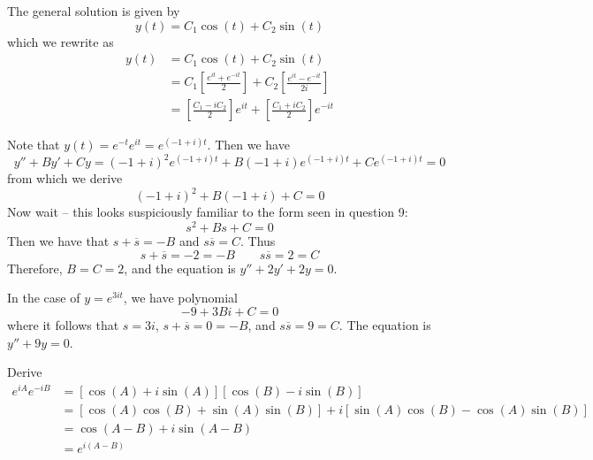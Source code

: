 \documentclass[a4paper]{article}
\begin{document}
The general solution is given by
\[
	y \!\left( t \right) = C_{1} \cos\left( t \right) + C_{2} \sin\left( t \right)
\]
which we rewrite as
\begin{align*}
	y \!\left( t \right)  & = C_{1} \cos\left( t \right) + C_{2} \sin\left( t \right) \\
	 & = C_{1} \!\left[ \frac{e^{i t} + e^{-i t}}{2} \right] + C_{2} \!\left[ \frac{e^{i t} - e^{-i t}}{2i} \right]   \\ 
	 & = \!\left[ \frac{C_{1} - iC_{2}}{2} \right] e^{i t} + \!\left[ \frac{C_{1} + iC_{2}}{2} \right] e^{-i t}
\end{align*}


Note that \(y \!\left( t \right) = e^{-t}e^{i t} = e^{\!\left( -1 + i \right) t}\). Then we have
\[
	y'' + By' + Cy = \!\left( -1 + i \right)^{2} e^{\!\left( -1 + i \right) t} + B \!\left( -1 + i \right)  e^{\!\left( -1 + i \right) t} + Ce^{\!\left( -1 + i \right) t} = 0
\]
from which we derive
\[
	\!\left( -1 + i \right)^{2} + B \!\left( -1 + i \right) + C = 0
\]
Now wait -- this looks suspiciously familiar to the form seen in question 9:
\[
	s^{2} + Bs + C = 0
\]
Then we have that \(s + \overline{s} = -B\) and \(s \overline{s} = C\). Thus
\[
	s + \overline{s} = -2 = -B \qquad s \overline{s} = 2 = C
\]
Therefore, \(B = C = 2\), and the equation is \(y'' + 2y' + 2y = 0\).

In the case of \(y = e^{3it}\), we have polynomial
\[
	-9 + 3Bi + C = 0
\]
where it follows that \(s = 3i\), \(s + \overline{s} = 0 = -B\), and \(s \overline{s} = 9 = C\). The equation is \(y'' + 9y = 0\).



Derive
\begin{align*}
	e^{iA}e^{-iB} & = \!\left[ \cos\left( A \right) + i \sin\left( A \right) \right] \!\left[ \cos\left( B \right) - i \sin\left( B \right) \right]  \\
	 & =  \!\left[ \cos\left( A \right)\cos\left( B \right) + \sin\left( A \right) \sin\left( B \right) \right] + i \!\left[ \sin\left( A \right) \cos\left( B \right) - \cos\left( A \right) \sin\left( B \right) \right] \\ 
	 & = \cos\left( A - B \right) + i \sin\left( A - B \right) \\
	 & = e^{i \!\left( A - B \right) }
\end{align*}
\end{document}
